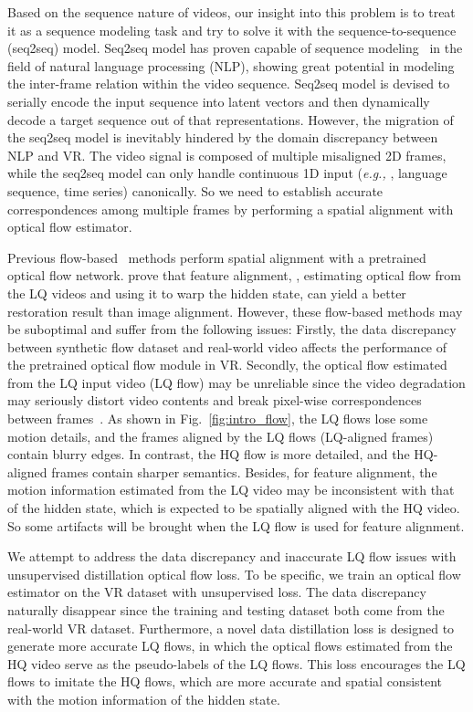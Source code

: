 \documentclass[nohyperref]{article}
\newcommand{\eg}{\emph{e.g., }}
\theoremstyle{plain}
\theoremstyle{definition}
\theoremstyle{remark}
\begin{document}
Based on the sequence nature of videos, our insight into this problem is to treat it as a sequence modeling task and try to solve it with the sequence-to-sequence (seq2seq) model. Seq2seq model has proven capable of sequence modeling~\cite{r8,r1,r2,r3} in the field of natural language processing (NLP), showing great potential in modeling the inter-frame relation within the video sequence. Seq2seq model
is devised to serially encode the input sequence into latent vectors and then dynamically decode a target sequence out of that representations. However, the migration of the seq2seq model is inevitably hindered by the domain discrepancy between NLP and VR. The video signal is composed of multiple misaligned 2D frames, while the seq2seq model can only handle continuous 1D input (\eg, language sequence, time series) canonically. So we need to establish accurate correspondences among multiple frames by performing a spatial alignment with optical flow estimator.

Previous flow-based~\cite{r45,r46,r47} methods perform spatial alignment with a pretrained optical flow network. \cite{r25} prove that feature alignment, , estimating optical flow from the LQ videos and using it to warp the hidden state, can yield a better restoration result than image alignment. However, these flow-based methods may be suboptimal and suffer from the following issues: Firstly, the data discrepancy between synthetic flow dataset and real-world video affects the performance of the pretrained optical flow module in VR. Secondly, the optical flow estimated from the LQ input video (LQ flow) may be unreliable since the video degradation may seriously distort video contents and break pixel-wise correspondences between frames~\cite{zheng2021adaptive}. As shown in Fig.~\ref{fig:intro_flow}, the LQ flows lose some motion details, and the frames aligned by the LQ flows (LQ-aligned frames) contain blurry edges. In contrast, the HQ flow is more detailed,  and the HQ-aligned frames contain sharper semantics. Besides, for feature alignment, the motion information estimated from the LQ video may be inconsistent with that of the hidden state, which is expected to be spatially aligned with the HQ video. So some artifacts will be brought when the LQ flow is used for feature alignment.

We attempt to address the data discrepancy and inaccurate LQ flow issues with unsupervised distillation optical flow loss. To be specific, we train an optical flow estimator on the VR dataset with unsupervised loss. The data discrepancy naturally disappear since the training and testing dataset both come from the real-world VR dataset. Furthermore, a novel data distillation loss is designed to generate more accurate LQ flows, in which the optical flows estimated from the HQ video serve as the pseudo-labels of the LQ flows. This loss encourages the LQ flows to imitate the HQ flows, which are more accurate and  spatial consistent with the motion information of the hidden state.
\end{document}
